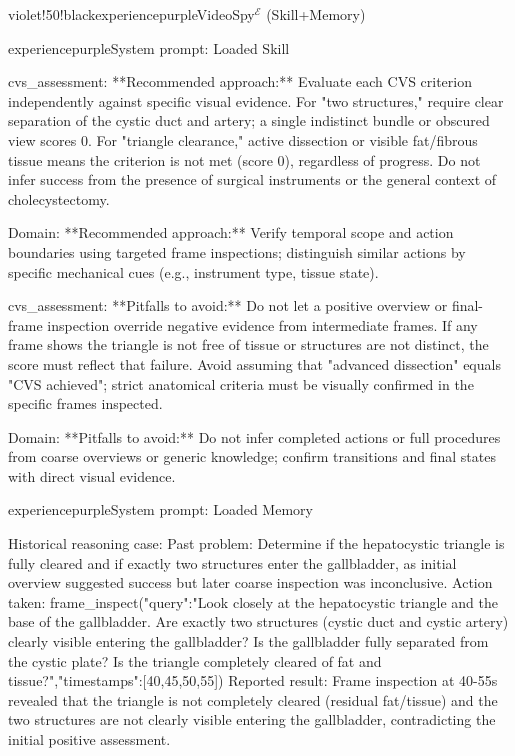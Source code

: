 \begin{ExecutionBox}[breakable,title after break={VideoSpy$^{\mathcal{E}}$ (Skill+Memory, continued)}]{violet!50!black}{experiencepurple}{VideoSpy$^{\mathcal{E}}$ (Skill+Memory)}
\raggedright
{}\par
\begin{MessageBox}{experiencepurple}{System prompt: Loaded Skill}
\begin{Trajectory}[highlightlines={4,5,13},highlightcolor=yellow!25]
cvs_assessment:
**Recommended approach:**
Evaluate each CVS criterion independently against specific visual evidence.
For "two structures," require clear separation of the cystic duct and artery; a single indistinct bundle or obscured view scores 0.
For "triangle clearance," active dissection or visible fat/fibrous tissue means the criterion is not met (score 0), regardless of progress.
Do not infer success from the presence of surgical instruments or the general context of cholecystectomy.

Domain:
**Recommended approach:** Verify temporal scope and action boundaries using targeted frame inspections; distinguish similar actions by specific mechanical cues (e.g., instrument type, tissue state).

cvs_assessment:
**Pitfalls to avoid:**
Do not let a positive overview or final-frame inspection override negative evidence from intermediate frames. If any frame shows the triangle is not free of tissue or structures are not distinct, the score must reflect that failure. Avoid assuming that "advanced dissection" equals "CVS achieved"; strict anatomical criteria must be visually confirmed in the specific frames inspected.

Domain:
**Pitfalls to avoid:** Do not infer completed actions or full procedures from coarse overviews or generic knowledge; confirm transitions and final states with direct visual evidence.
\end{Trajectory}
\end{MessageBox}
\begin{MessageBox}{experiencepurple}{System prompt: Loaded Memory}
\begin{Trajectory}
Historical reasoning case:
Past problem: Determine if the hepatocystic triangle is fully cleared and if exactly two structures enter the gallbladder, as initial overview suggested success but later coarse inspection was inconclusive.
Action taken: frame_inspect({"query":"Look closely at the hepatocystic triangle and the base of the gallbladder. Are exactly two structures (cystic duct and cystic artery) clearly visible entering the gallbladder? Is the gallbladder fully separated from the cystic plate? Is the triangle completely cleared of fat and tissue?","timestamps":[40,45,50,55]})
Reported result: Frame inspection at 40-55s revealed that the triangle is not completely cleared (residual fat/tissue) and the two structures are not clearly visible entering the gallbladder, contradicting the initial positive assessment.


\end{Trajectory}
\end{MessageBox}
\end{ExecutionBox}

